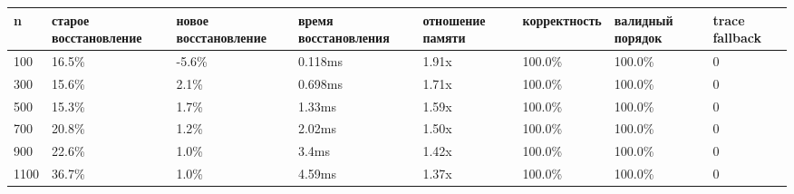 \begin{tabular}{llllllll}
\toprule
n & старое восстановление & новое восстановление & время восстановления & отношение памяти & корректность & валидный порядок & trace fallback \\
\midrule
100 & 16.5\% & -5.6\% & 0.118ms & 1.91x & 100.0\% & 100.0\% & 0 \\
300 & 15.6\% & 2.1\% & 0.698ms & 1.71x & 100.0\% & 100.0\% & 0 \\
500 & 15.3\% & 1.7\% & 1.33ms & 1.59x & 100.0\% & 100.0\% & 0 \\
700 & 20.8\% & 1.2\% & 2.02ms & 1.50x & 100.0\% & 100.0\% & 0 \\
900 & 22.6\% & 1.0\% & 3.4ms & 1.42x & 100.0\% & 100.0\% & 0 \\
1100 & 36.7\% & 1.0\% & 4.59ms & 1.37x & 100.0\% & 100.0\% & 0 \\
\bottomrule
\end{tabular}
